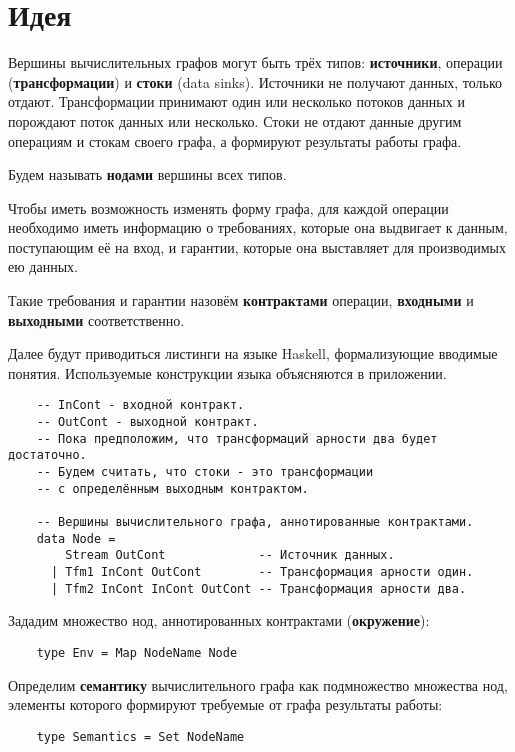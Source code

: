 \section{Идея}

Вершины вычислительных графов могут быть трёх типов: \textbf{источники}, операции (\textbf{трансформации}) и \textbf{стоки} (data sinks). Источники не получают данных, только отдают. Трансформации принимают один или несколько потоков данных и порождают поток данных или несколько. Стоки не отдают данные другим операциям и стокам своего графа, а формируют результаты работы графа.

Будем называть \textbf{нодами} вершины всех типов.

Чтобы иметь возможность изменять форму графа, для каждой операции необходимо иметь информацию о требованиях, которые она выдвигает к данным, поступающим её на вход, и гарантии, которые она выставляет для производимых ею данных.

Такие требования и гарантии назовём \textbf{контрактами} операции, \textbf{входными} и \textbf{выходными} соответственно.

Далее будут приводиться листинги на языке Haskell, формализующие вводимые понятия.
Используемые конструкции языка объясняются в приложении. %

\begin{lstlisting}
    -- InCont - входной контракт.
    -- OutCont - выходной контракт.
    -- Пока предположим, что трансформаций арности два будет достаточно.
    -- Будем считать, что стоки - это трансформации
    -- с определённым выходным контрактом.

    -- Вершины вычислительного графа, аннотированные контрактами.
    data Node =
        Stream OutCont             -- Источник данных.
      | Tfm1 InCont OutCont        -- Трансформация арности один.
      | Tfm2 InCont InCont OutCont -- Трансформация арности два.
\end{lstlisting}

Зададим множество нод, аннотированных контрактами (\textbf{окружение}):
\begin{lstlisting}
    type Env = Map NodeName Node
\end{lstlisting}

Определим \textbf{семантику} вычислительного графа как подмножество множества нод, элементы которого формируют требуемые от графа результаты работы:
\begin{lstlisting}
    type Semantics = Set NodeName
\end{lstlisting}

